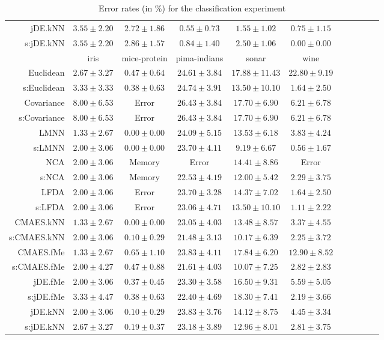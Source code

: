 \begin{table}[ht]
{\begin{tabular}{rcccccccccc}
jDE.kNN & $3.55\pm2.20$ & $2.72\pm1.86$ & $0.55\pm0.73$ & $1.55\pm1.02$ & $0.75\pm1.15$ \\
s:jDE.kNN & $3.55\pm2.20$ & $2.86\pm1.57$ & $0.84\pm1.40$ & $2.50\pm1.06$ & $\bm{0.00\pm0.00}$ \\
\midrule
& \multicolumn{1}{c}{iris} & \multicolumn{1}{c}{mice-protein} & \multicolumn{1}{c}{pima-indians} & \multicolumn{1}{c}{sonar} & \multicolumn{1}{c}{wine} \\ 
\midrule
Euclidean & $2.67\pm3.27$ & $0.47\pm0.64$ & $24.61\pm3.84$ & $17.88\pm11.43$ & $22.80\pm9.19$ \\
s:Euclidean & $3.33\pm3.33$ & $0.38\pm0.63$ & $24.74\pm3.91$ & $13.50\pm10.10$ & $1.64\pm2.50$ \\
Covariance & $8.00\pm6.53$ & Error  & $26.43\pm3.84$ & $17.70\pm6.90$ & $6.21\pm6.78$ \\
s:Covariance & $8.00\pm6.53$ & Error  & $26.43\pm3.84$ & $17.70\pm6.90$ & $6.21\pm6.78$ \\
LMNN & $\bm{1.33\pm2.67}$ & $\bm{0.00\pm0.00}$ & $24.09\pm5.15$ & $13.53\pm6.18$ & $3.83\pm4.24$ \\
s:LMNN & $2.00\pm3.06$ & $\bm{0.00\pm0.00}$ & $23.70\pm4.11$ & $\bm{9.19\pm6.67}$ & $\bm{0.56\pm1.67}$ \\
NCA & $2.00\pm3.06$ & Memory  & Error  & $14.41\pm8.86$ & Error  \\
s:NCA & $2.00\pm3.06$ & Memory  & $22.53\pm4.19$ & $12.00\pm5.42$ & $2.29\pm3.75$ \\
LFDA & $2.00\pm3.06$ & Error  & $23.70\pm3.28$ & $14.37\pm7.02$ & $1.64\pm2.50$ \\
s:LFDA & $2.00\pm3.06$ & Error  & $23.06\pm4.71$ & $13.50\pm10.10$ & $1.11\pm2.22$ \\
CMAES.kNN & $\bm{1.33\pm2.67}$ & $\bm{0.00\pm0.00}$ & $23.05\pm4.03$ & $13.48\pm8.57$ & $3.37\pm4.55$ \\
s:CMAES.kNN & $2.00\pm3.06$ & $0.10\pm0.29$ & $\bm{21.48\pm3.13}$ & $10.17\pm6.39$ & $2.25\pm3.72$ \\
CMAES.fMe & $\bm{1.33\pm2.67}$ & $0.65\pm1.10$ & $23.83\pm4.11$ & $17.84\pm6.20$ & $12.90\pm8.52$ \\
s:CMAES.fMe & $2.00\pm4.27$ & $0.47\pm0.88$ & $21.61\pm4.03$ & $10.07\pm7.25$ & $2.82\pm2.83$ \\
jDE.fMe & $2.00\pm3.06$ & $0.37\pm0.45$ & $23.30\pm3.58$ & $16.50\pm9.31$ & $5.59\pm5.05$ \\
s:jDE.fMe & $3.33\pm4.47$ & $0.38\pm0.63$ & $22.40\pm4.69$ & $18.30\pm7.41$ & $2.19\pm3.66$ \\
jDE.kNN & $2.00\pm3.06$ & $0.10\pm0.29$ & $23.83\pm3.76$ & $14.12\pm8.75$ & $4.45\pm3.34$ \\
s:jDE.kNN & $2.67\pm3.27$ & $0.19\pm0.37$ & $23.18\pm3.89$ & $12.96\pm8.01$ & $2.81\pm3.75$ \\


\bottomrule
\end{tabular}
}
\caption{Error rates (in \%) for the classification experiment} \label{tab:error-rates}
\end{table}
